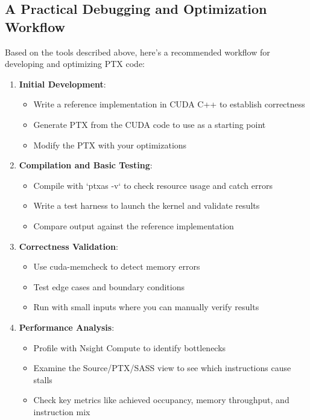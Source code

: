 \subsection{A Practical Debugging and Optimization Workflow}

Based on the tools described above, here's a recommended workflow for developing and optimizing PTX code:

\begin{enumerate}
    \item \textbf{Initial Development}:
    \begin{itemize}
        \item Write a reference implementation in CUDA C++ to establish correctness
        \item Generate PTX from the CUDA code to use as a starting point
        \item Modify the PTX with your optimizations
    \end{itemize}
    
    \item \textbf{Compilation and Basic Testing}:
    \begin{itemize}
        \item Compile with `ptxas -v` to check resource usage and catch errors
        \item Write a test harness to launch the kernel and validate results
        \item Compare output against the reference implementation
    \end{itemize}
    
    \item \textbf{Correctness Validation}:
    \begin{itemize}
        \item Use cuda-memcheck to detect memory errors
        \item Test edge cases and boundary conditions
        \item Run with small inputs where you can manually verify results
    \end{itemize}
    
    \item \textbf{Performance Analysis}:
    \begin{itemize}
        \item Profile with Nsight Compute to identify bottlenecks
        \item Examine the Source/PTX/SASS view to see which instructions cause stalls
        \item Check key metrics like achieved occupancy, memory throughput, and instruction mix
    \end{itemize}
    

\end{enumerate}
